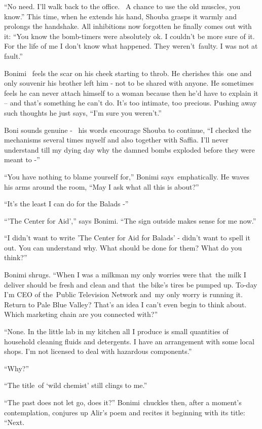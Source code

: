 \documentclass[twoside,11pt]{book}
\begin{document}
``No need. I'll walk back to the office. \ A chance to use the old muscles, you know.'' This
time, when he extends his hand, Shouba grasps it warmly and prolongs the handshake. All inhibitions now forgotten he
finally comes out with it: ``You know the bomb-timers were absolutely ok. I couldn't be more sure of it.
For the life of me I don't know what happened. They weren't~faulty. I was not at fault.''

Bonimi~ feels the scar on his cheek starting to throb. He cherishes this~one and only souvenir his brother left him -
not to be shared with anyone. He sometimes feels he can never attach himself to a woman because then he'd have to
explain it -- and that's something he can't do. It's too intimate, too precious. Pushing away such thoughts he just
says, ``I'm sure you weren't.''

Boni sounds genuine - \ his words encourage Shouba to continue, ``I checked the mechanisms several times
myself and also together with Saffia. I'll never understand till my dying day{
}why the damned{ }bombs exploded before they were meant to -''

``You have nothing to blame yourself for,'' Bonimi says~emphatically. He waves his arms around
the room, ``May I ask what all this is about?''

``It's the least I can do for the Balads -''

``'The Center for Aid','' says Bonimi. ``The sign outside makes sense for me
now.''

``I didn't want to write 'The Center for Aid for Balads' - didn't want to spell it out. You can understand
why. What should be done for them? What do you think?''

Bonimi shrugs. ``When I was a milkman my only worries were that~the milk I deliver should be fresh and
clean and that~the bike's tires be pumped up. To-day I'm CEO of the~Public Television Network and~my only worry is
running it.~ Return to Pale Blue Valley? That's an idea I can't even begin to think about. Which marketing chain are
you connected with?''

``None. In the little lab in my kitchen all I produce is small quantities of household cleaning fluids and
detergents. I have an arrangement with some local shops. I'm not licensed to deal with hazardous
components.''

``Why?''

``The title~of `wild chemist' still clings to me.''

``The past does not let go, does it?'' Bonimi~chuckles then, after a moment's contemplation,
conjures up Alir's poem and recites it beginning with its title: ``Next.
\end{document}
